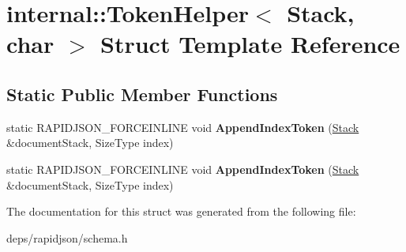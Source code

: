 \hypertarget{structinternal_1_1_token_helper_3_01_stack_00_01char_01_4}{}\section{internal\+:\+:Token\+Helper$<$ Stack, char $>$ Struct Template Reference}
\label{structinternal_1_1_token_helper_3_01_stack_00_01char_01_4}
\subsection*{Static Public Member Functions}
\begin{DoxyCompactItemize}
\item 
static R\+A\+P\+I\+D\+J\+S\+O\+N\+\_\+\+F\+O\+R\+C\+E\+I\+N\+L\+I\+NE void {\bfseries Append\+Index\+Token} (\hyperlink{classinternal_1_1_stack}{Stack} \&document\+Stack, Size\+Type index)\hypertarget{structinternal_1_1_token_helper_3_01_stack_00_01char_01_4_a5d635eb7590e098c3340c9e5dcc72ae3}{}\label{structinternal_1_1_token_helper_3_01_stack_00_01char_01_4_a5d635eb7590e098c3340c9e5dcc72ae3}

\item 
static R\+A\+P\+I\+D\+J\+S\+O\+N\+\_\+\+F\+O\+R\+C\+E\+I\+N\+L\+I\+NE void {\bfseries Append\+Index\+Token} (\hyperlink{classinternal_1_1_stack}{Stack} \&document\+Stack, Size\+Type index)\hypertarget{structinternal_1_1_token_helper_3_01_stack_00_01char_01_4_a5d635eb7590e098c3340c9e5dcc72ae3}{}\label{structinternal_1_1_token_helper_3_01_stack_00_01char_01_4_a5d635eb7590e098c3340c9e5dcc72ae3}

\end{DoxyCompactItemize}


The documentation for this struct was generated from the following file\+:\begin{DoxyCompactItemize}
\item 
deps/rapidjson/schema.\+h\end{DoxyCompactItemize}
